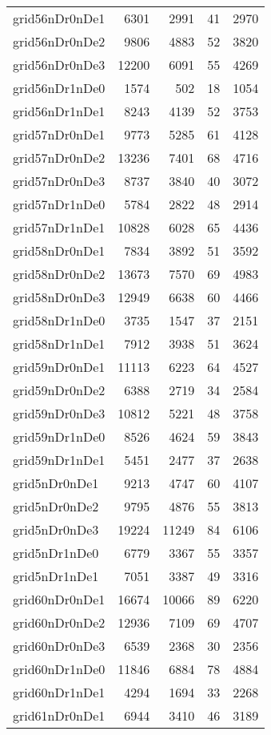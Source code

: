 \documentclass[../../../thesis.tex]{subfiles}
\begin{document}
\begin{longtable}{lrrrr}
grid56nDr0nDe1 & 6301 & 2991 & 41 & 2970 \\
grid56nDr0nDe2 & 9806 & 4883 & 52 & 3820 \\
grid56nDr0nDe3 & 12200 & 6091 & 55 & 4269 \\
grid56nDr1nDe0 & 1574 & 502 & 18 & 1054 \\
grid56nDr1nDe1 & 8243 & 4139 & 52 & 3753 \\
grid57nDr0nDe1 & 9773 & 5285 & 61 & 4128 \\
grid57nDr0nDe2 & 13236 & 7401 & 68 & 4716 \\
grid57nDr0nDe3 & 8737 & 3840 & 40 & 3072 \\
grid57nDr1nDe0 & 5784 & 2822 & 48 & 2914 \\
grid57nDr1nDe1 & 10828 & 6028 & 65 & 4436 \\
grid58nDr0nDe1 & 7834 & 3892 & 51 & 3592 \\
grid58nDr0nDe2 & 13673 & 7570 & 69 & 4983 \\
grid58nDr0nDe3 & 12949 & 6638 & 60 & 4466 \\
grid58nDr1nDe0 & 3735 & 1547 & 37 & 2151 \\
grid58nDr1nDe1 & 7912 & 3938 & 51 & 3624 \\
grid59nDr0nDe1 & 11113 & 6223 & 64 & 4527 \\
grid59nDr0nDe2 & 6388 & 2719 & 34 & 2584 \\
grid59nDr0nDe3 & 10812 & 5221 & 48 & 3758 \\
grid59nDr1nDe0 & 8526 & 4624 & 59 & 3843 \\
grid59nDr1nDe1 & 5451 & 2477 & 37 & 2638 \\
grid5nDr0nDe1 & 9213 & 4747 & 60 & 4107 \\
grid5nDr0nDe2 & 9795 & 4876 & 55 & 3813 \\
grid5nDr0nDe3 & 19224 & 11249 & 84 & 6106 \\
grid5nDr1nDe0 & 6779 & 3367 & 55 & 3357 \\
grid5nDr1nDe1 & 7051 & 3387 & 49 & 3316 \\
grid60nDr0nDe1 & 16674 & 10066 & 89 & 6220 \\
grid60nDr0nDe2 & 12936 & 7109 & 69 & 4707 \\
grid60nDr0nDe3 & 6539 & 2368 & 30 & 2356 \\
grid60nDr1nDe0 & 11846 & 6884 & 78 & 4884 \\
grid60nDr1nDe1 & 4294 & 1694 & 33 & 2268 \\
grid61nDr0nDe1 & 6944 & 3410 & 46 & 3189 \\

\end{longtable}
\end{document}
